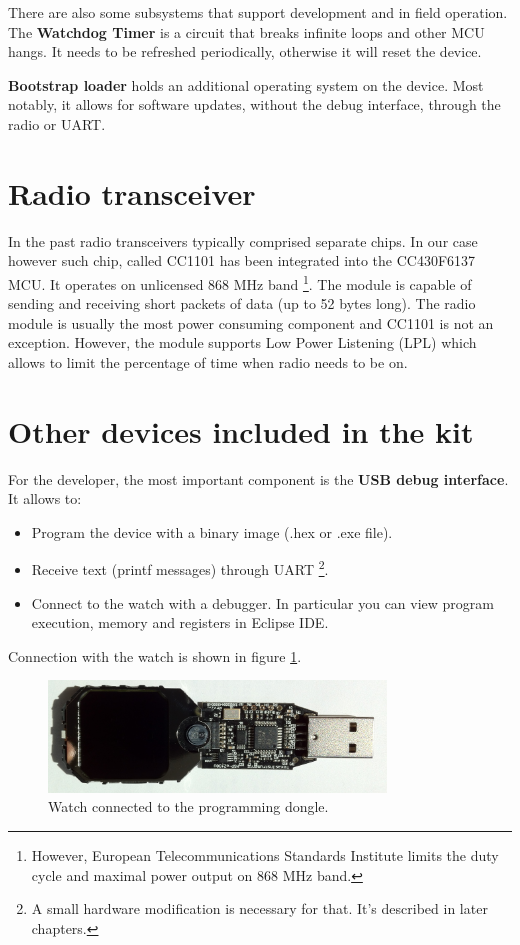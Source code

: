 There are also some subsystems that support development and in field
operation. The {\bf Watchdog Timer} is a circuit that breaks infinite
loops and other MCU hangs. It needs to be refreshed periodically,
otherwise it will reset the device.

{\bf Bootstrap loader} holds an additional operating system on the
device.  Most notably, it allows for software updates, without the
debug interface, through the radio or UART.

\section{Radio transceiver}

In the past radio transceivers typically comprised separate chips. In
our case however such chip, called CC1101 has been integrated into the
CC430F6137 MCU.  It operates on unlicensed 868 MHz band
\footnote{However, European Telecommunications Standards Institute
limits the duty cycle and maximal power output on 868 MHz band.}.  The
module is capable of sending and receiving short packets of data (up
to 52 bytes long).  The radio module is usually the most power
consuming component and CC1101 is not an exception.  However, the
module supports Low Power Listening (LPL) which allows to limit the
percentage of time when radio needs to be on.

\section{Other devices included in the kit}
For the developer, the most important component is the {\bf USB debug
interface}. It allows to:
\begin{itemize}
  \item Program the device with a binary image (.hex or .exe file).
  \item Receive text (printf messages) through UART \footnote{A small
    hardware modification is necessary for that. It's described in
    later chapters.}.
  \item Connect to the watch with a debugger. In particular you can
    view program execution, memory and registers in Eclipse IDE.
\end{itemize}
Connection with the watch is shown in figure \ref{fig:chronos_dongle}.

\begin{figure}[h]
  \centering
  \includegraphics[width=0.8\textwidth]{img/chronos_dongle.jpg}
  \caption{Watch connected to the programming dongle.}
  \label{fig:chronos_dongle}
\end{figure}


